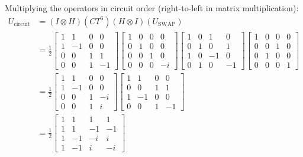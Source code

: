 \documentclass{article}
\begin{document}
\begin{enumerate}[(a)]
    Multiplying the operators in circuit order (right-to-left in matrix multiplication):
    \begin{align*}
    U_{\text{circuit}} &= (I \otimes H)(CT^6)(H \otimes I)(U_{\text{SWAP}}) \\
    &= \frac{1}{2} \begin{bmatrix} 1 & 1 & 0 & 0 \\ 1 & -1 & 0 & 0 \\ 0 & 0 & 1 & 1 \\ 0 & 0 & 1 & -1 \end{bmatrix} \begin{bmatrix} 1 & 0 & 0 & 0 \\ 0 & 1 & 0 & 0 \\ 0 & 0 & 1 & 0 \\ 0 & 0 & 0 & -i \end{bmatrix} \begin{bmatrix} 1 & 0 & 1 & 0 \\ 0 & 1 & 0 & 1 \\ 1 & 0 & -1 & 0 \\ 0 & 1 & 0 & -1 \end{bmatrix} \begin{bmatrix} 1 & 0 & 0 & 0 \\ 0 & 0 & 1 & 0 \\ 0 & 1 & 0 & 0 \\ 0 & 0 & 0 & 1 \end{bmatrix} \\
    &= \frac{1}{2} \begin{bmatrix} 1 & 1 & 0 & 0 \\ 1 & -1 & 0 & 0 \\ 0 & 0 & 1 & -i \\ 0 & 0 & 1 & i \end{bmatrix} \begin{bmatrix} 1 & 1 & 0 & 0 \\ 0 & 0 & 1 & 1 \\ 1 & -1 & 0 & 0 \\ 0 & 0 & 1 & -1 \end{bmatrix} \\
    &= \frac{1}{2} \begin{bmatrix}
        1 & 1 & 1 & 1 \\
        1 & 1 & -1 & -1 \\
        1 & -1 & -i & i \\
        1 & -1 & i & -i
    \end{bmatrix}
    \end{align*}


\end{enumerate}
\end{document}
